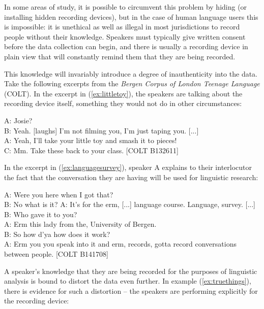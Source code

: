 In some areas of study, it is possible to circumvent this problem by hiding (or installing hidden recording devices), but in the case of human language users this is impossible: it is unethical as well as illegal in most jurisdictions to record people without their knowledge. Speakers must typically give written consent before the data collection can begin, and there is usually a recording device in plain view that will constantly remind them that they are being recorded.

This knowledge will invariably introduce a degree of inauthenticity into the data. Take the following excerpts from the \emph{Bergen Corpus of London Teenage Language} (COLT). In the excerpt in (\ref{ex:littletoy}), the speakers are talking about the recording device itself, something they would not do in other circumstances:

\begin{exe}
\ex
\label{ex:littletoy}
A: Josie? \\
B: Yeah. [laughs] I'm not filming you, I'm just taping you. [...]  \\
A: Yeah, I'll take your little toy and smash it to pieces!  \\
C: Mm. Take these back to your class. [COLT B132611] 
\end{exe}

In the excerpt in (\ref{ex:languagesurvey}), speaker A explains to their interlocutor the fact that the conversation they are having will be used for linguistic research:

\begin{exe}
\ex
\label{ex:languagesurvey}
A: Were you here when I got that? \\
B: No what is it? A: It's for the erm, [...] language course. Language, survey. [...] \\
B: Who gave it to you? \\
A: Erm this lady from the, University of Bergen. \\
B: So how d'ya how does it work? \\
A: Erm you you speak into it and erm, records, gotta record conversations between people. [COLT B141708] 
\end{exe}

A speaker's knowledge that they are being recorded for the purposes of linguistic analysis is bound to distort the data even further. In example (\ref{ex:truethings}), there is evidence for such a distortion -- the speakers are performing explicitly for the recording device:

